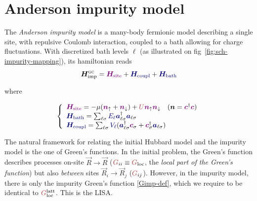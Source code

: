 \documentclass[reprint,amsmath,amssymb,aps,pra]{revtex4-2}
\newcommand{\tmem}[1]{{\em #1\/}}
\newcommand{\tmbf}[1]{\ensuremath{\boldsymbol{#1}}}
\newcommand{\tmname}[1]{\textsc{#1}}
\begin{document}
\section{Anderson impurity model}\label{impurity_model_section}

The \textit{Anderson impurity model} is a many-body fermionic model describing a single site, with repulsive Coulomb interaction, coupled to a bath allowing for charge fluctuations. With discretized bath levels $\ell$ (as illustrated on fig~\ref{fig:sch-impurity-mapping}), its hamiltonian reads
\begin{equation}
  \tmbf{H}_{\text{imp}}^{\mathrm{{\tmname{gc}}}} =
  {\color[HTML]{800080}\tmbf{H}_{\text{site}}} +
  {\color[HTML]{000080}\tmbf{H}_{\text{coupl}}} +
  {\color[HTML]{000080}\tmbf{H}_{\text{bath}}}
\label{impurity-hamiltonian}
\end{equation}
\centerline{where}
\[
  \left\{\begin{array}{l}
    {\color[HTML]{800080}\tmbf{H}_{\text{site}}} =  - \mu
    ({\color[HTML]{800080}\tmbf{n}}_{\uparrow} +
    {\color[HTML]{800080}\tmbf{n}}_{\downarrow}) + {\color[HTML]{BF4040}U}
    {\color[HTML]{800080}\tmbf{n}}_{\uparrow} 
    {\color[HTML]{800080}\tmbf{n}}_{\downarrow} \quad (\tmbf{n}=
    {\color[HTML]{800080}\tmbf{c}}^{\dag} 
    {\color[HTML]{800080}\tmbf{c}})\\
    {\color[HTML]{000080}\tmbf{H}_{\text{bath}}} = \sum_{\ell \sigma}
    {\color[HTML]{000080}E_{\ell}}  {\color[HTML]{000080}\tmbf{a}}_{\ell
    \sigma}^{\dag}  {\color[HTML]{000080}\tmbf{a}}_{\ell \sigma}\\
    {\color[HTML]{000080}\tmbf{H}_{\text{coupl}}} = \sum_{\ell \sigma}
    {\color[HTML]{000080}V_{\ell}}  ({\color[HTML]{000080}\tmbf{a}}_{\ell
    \sigma}^{\dag}  {\color[HTML]{800080}\tmbf{c}}_{\sigma} +
    {\color[HTML]{800080}\tmbf{c}}_{\sigma}^{\dag} 
    {\color[HTML]{000080}\tmbf{a}}_{\ell \sigma})
  \end{array}\right.  
\]

The natural framework for relating the initial Hubbard model and the impurity
model is the one of Green's functions. In the initial problem, the Green's
function describes processes on-site $\vec{R} \rightarrow \vec{R}$
(${\color[HTML]{BF4040}G}_{i i} \equiv {\color[HTML]{BF4040}G}_{\text{loc}}$,
the {\tmem{local part of the Green's function}}) but also {\tmem{between}}
sites $\vec{R}_i \rightarrow \vec{R}_j$ (${\color[HTML]{BF4040}G}_{i j}$). However, in the impurity model,
there is only the impurity Green's function \eqref{Gimp-def}, which we require to be identical to ${\color[HTML]{BF4040}G}_{\text{loc}}^\text{latt}$. This is the LISA.
\end{document}

